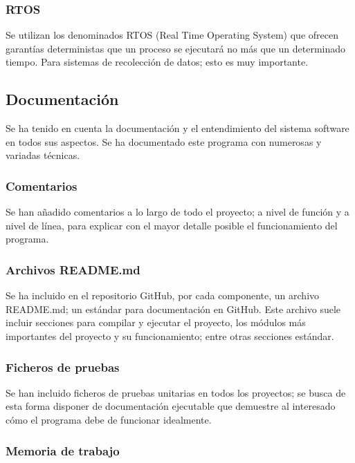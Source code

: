 \documentclass[12pt,a4paper,twoside,openright]{book}
\begin{document}
\subsubsection{RTOS}

Se utilizan los denominados RTOS (Real Time Operating System) que ofrecen garantías deterministas que un proceso se ejecutará no más que un determinado tiempo. Para sistemas de recolección de datos; esto es muy importante.

\subsection{Documentación}

Se ha tenido en cuenta la documentación y el entendimiento del sistema software en todos sus aspectos. Se ha documentado este programa con numerosas y variadas técnicas.

\subsubsection{Comentarios}

Se han añadido comentarios a lo largo de todo el proyecto; a nivel de función y a nivel de línea, para explicar con el mayor detalle posible el funcionamiento del programa.

\subsubsection{Archivos README.md}

Se ha incluido en el repositorio GitHub, por cada componente, un archivo README.md; un estándar para documentación en GitHub. Este archivo suele incluir secciones para compilar y ejecutar el proyecto, los módulos más importantes del proyecto y su funcionamiento; entre otras secciones estándar.

\subsubsection{Ficheros de pruebas}

Se han incluido ficheros de pruebas unitarias en todos los proyectos; se busca de esta forma disponer de documentación ejecutable que demuestre al interesado cómo el programa debe de funcionar idealmente.

\subsubsection{Memoria de trabajo}
\end{document}

